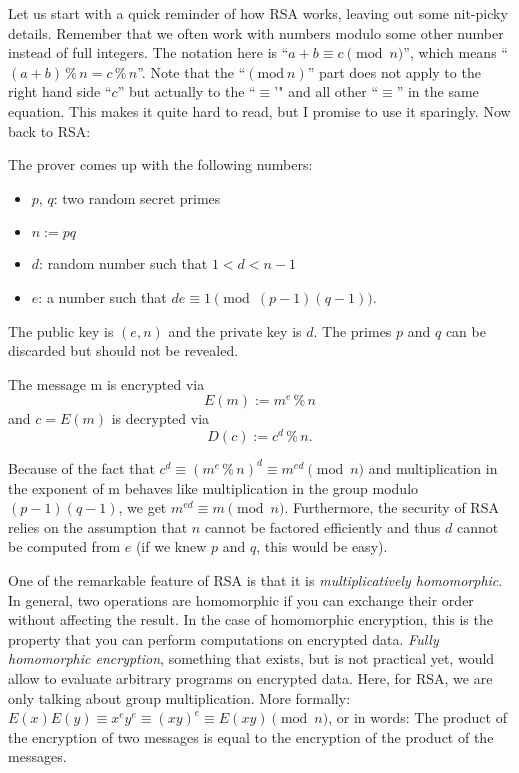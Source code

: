 \documentclass[11pt,letterpaper]{article}
\begin{document}
Let us start with a quick reminder of how RSA works, leaving out some nit-picky details. Remember that we often work with numbers modulo some other number instead of full integers. The notation here is ``$a + b  \equiv  c \pmod{n}$'', which means ``$(a + b) \mathbin{\%} n = c \mathbin{\%} n$''. Note that the ``$(\text{mod}\ n)$'' part does not apply to the right hand side ``$c$'' but actually to the ``$ \equiv $'" and all other ``$ \equiv $'' in the same equation. This makes it quite hard to read, but I promise to use it sparingly. Now back to RSA:

The prover comes up with the following numbers:
\begin{itemize}
\item $p$, $q$: two random secret primes
\item $n := p q$
\item $d$: random number such that $1 < d < n - 1$
\item $e$: a number such that  $d e  \equiv  1 \pmod{(p-1)(q-1)}$.
\end{itemize}
The public key is $(e, n)$ and the private key is $d$. The primes $p$ and $q$ can be discarded but should not be revealed.

The message m is encrypted via
    \[ E(m) := m^e \mathbin{\%} n \]
and $c = E(m)$ is decrypted via
    \[ D(c) := c^d \mathbin{\%} n.\]

Because of the fact that $c^d  \equiv  (m^e \mathbin{\%} n)^d  \equiv  m^{ed} \pmod{n}$ and multiplication in the exponent of m behaves like multiplication in the group modulo $(p-1)(q-1)$, we get $m^{ed}  \equiv  m \pmod{n}$. Furthermore, the security of RSA relies on the assumption that $n$ cannot be factored efficiently and thus $d$ cannot be computed from $e$ (if we knew $p$ and $q$, this would be easy).

One of the remarkable feature of RSA is that it is \textit{multiplicatively homomorphic}. In general, two operations are homomorphic if you can exchange their order without affecting the result. In the case of homomorphic encryption, this is the property that you can perform computations on encrypted data. \textit{Fully homomorphic encryption}, something that exists, but is not practical yet, would allow to evaluate arbitrary programs on encrypted data. Here, for RSA, we are only talking about group multiplication. More formally: $E(x) E(y)  \equiv  x^ey^e  \equiv  (xy)^{e}  \equiv  E(x y) \pmod{n}$, or in words: The product of the encryption of two messages is equal to the encryption of the product of the messages.
\end{document}
